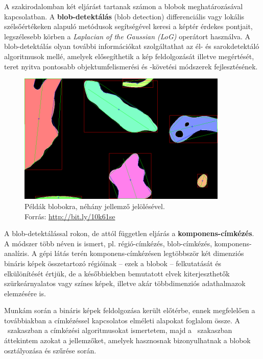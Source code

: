 \bigskip

A szakirodalomban két eljárást tartanak számon a blobok meghatározásával kapcsolatban. A \textbf{blob-detektálás} (blob detection) differenciális vagy lokális szélsőértékeken alapuló metódusok segítségével keresi a képtér érdekes pontjait, legszélesebb körben a \emph{Laplacian of the Gaussian (LoG)} operátort használva. A blob-detektálás olyan további információkat szolgáltathat az él- és sarokdetektáló algoritmusok mellé, amelyek elősegíthetik a kép feldolgozását illetve megértését, teret nyitva pontosabb objektumfelismerési és -követési módszerek fejlesztésének.

\begin{figure}[!ht]
\centering
\includegraphics[width=100mm, keepaspectratio]{figures/blob_sshot.png}
\caption{Példák blobokra, néhány jellemző jelölésével.\\Forrás: \url{http://bit.ly/10k61se}}
\label{fig:blob_sshot}
\end{figure}

A blob-detektálással rokon, de attól független eljárás a \textbf{komponens-címkézés}. A módszer több néven is ismert, pl. régió-címkézés, blob-címkézés, komponens-analízis. A gépi látás terén komponens-címkézésen legtöbbször két dimenziós bináris képek összetartozó régióinak -- ezek a blobok -- felkutatását és elkülönítését értjük, de a későbbiekben bemutatott elvek kiterjeszthetők szürkeárnyalatos vagy színes képek, illetve akár többdimenziós adathalmazok elemzésére is.

\bigskip

Munkám során a bináris képek feldolgozása került előtérbe, ennek megfelelően a továbbiakban a címkézéssel kapcsolatos elméleti alapokat foglalom össze. A ~szakaszban a címkézési algoritmusokat ismertetem, majd a ~szakaszban áttekintem azokat a jellemzőket, amelyek hasznosnak bizonyulhatnak a blobok osztályozása és szűrése során.

